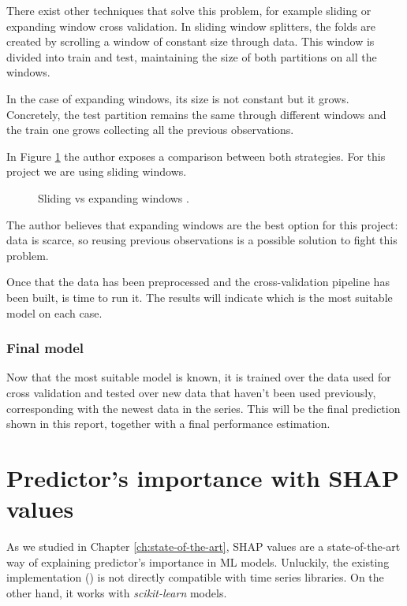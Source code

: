 There exist other techniques that solve this problem, for example sliding or expanding window cross validation.
In sliding window splitters, the folds are created by scrolling a window of constant size through data.
This window is divided into train and test, maintaining the size of both partitions on all the windows.

In the case of expanding windows, its size is not constant but it grows. Concretely, the test partition remains the same through different windows and the train one grows collecting all the previous observations.

In Figure \ref{fig:sliding-expanding-windows} the author exposes a comparison between both strategies. For this project we are using sliding windows.

\begin{figure}[H]
\centering
    \caption{Sliding vs expanding windows \cite{sliding-expanding-windows}.}
    \label{fig:sliding-expanding-windows}
\end{figure}

The author believes that expanding windows are the best option for this project: data is scarce, so reusing previous observations is a possible solution to fight this problem.

Once that the data has been preprocessed and the cross-validation pipeline has been built, is time to run it.
The results will indicate which is the most suitable model on each case.

\subsubsection{Final model}
Now that the most suitable model is known, it is trained over the data used for cross validation and tested over new data that haven't been used previously, corresponding with the newest data in the series. This will be the final prediction shown in this report, together with a final performance estimation.

\section{Predictor's importance with SHAP values}
As we studied in Chapter \ref{ch:state-of-the-art}, SHAP values are a state-of-the-art way of explaining predictor's importance in ML models. Unluckily, the existing implementation (\cite{shap-package}) is not directly compatible with time series libraries. On the other hand, it works with \textit{scikit-learn} models.


